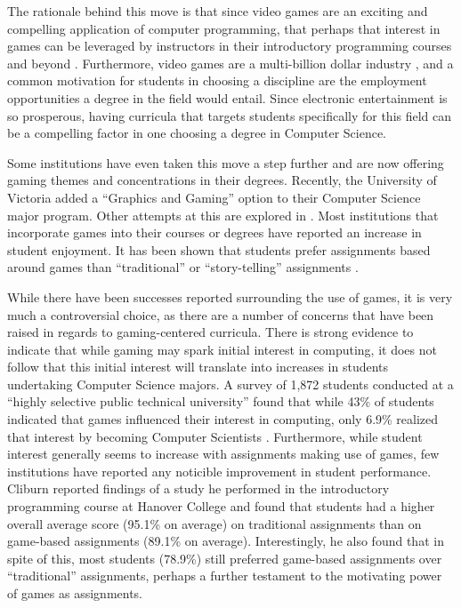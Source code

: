 The rationale behind this move is that since video games are an exciting and compelling application of computer programming, that perhaps that interest in games can be leveraged by instructors in their introductory programming courses and beyond \cite{Overmars04,Sweedyk05,Barnes08}.  Furthermore, video games are a multi-billion dollar industry \cite{Wallace06}, and a common motivation for students in choosing a discipline are the employment opportunities a degree in the field would entail.  Since electronic entertainment is so prosperous, having curricula that targets students specifically for this field can be a compelling factor in one choosing a degree in Computer Science.

Some institutions have even taken this move a step further and are now offering gaming themes and concentrations in their degrees.  Recently, the University of Victoria added a ``Graphics and Gaming'' option to their Computer Science major program.  Other attempts at this are explored in \cite{Leutenegger07,Murray06,Zyda06}.  Most institutions that incorporate games into their courses or degrees have reported an increase in student enjoyment.  It has been shown that students prefer assignments based around games than ``traditional'' or ``story-telling'' assignments \cite{Cliburn08}.


While there have been successes reported surrounding the use of games, it is very much a controversial choice, as there are a number of concerns that have been raised in regards to gaming-centered curricula.  There is strong evidence to indicate that while gaming may spark initial interest in computing, it does not follow that this initial interest will translate into increases in students undertaking Computer Science majors.  A survey of 1,872 students conducted at a ``highly selective public technical university'' found that while 43\% of students indicated that games influenced their interest in computing, only 6.9\% realized that interest by becoming Computer Scientists \cite{DiSalvo09}.  Furthermore, while student interest generally seems to increase with assignments making use of games, few institutions have reported any noticible improvement in student performance.  Cliburn reported findings of a study he performed in the introductory programming course at Hanover College and found that students had a higher overall average score (95.1\% on average) on traditional assignments than on game-based assignments (89.1\% on average)\cite{Cliburn06}.  Interestingly, he also found that in spite of this, most students (78.9\%) still preferred game-based assignments over ``traditional'' assignments, perhaps a further testament to the motivating power of games as assignments.

